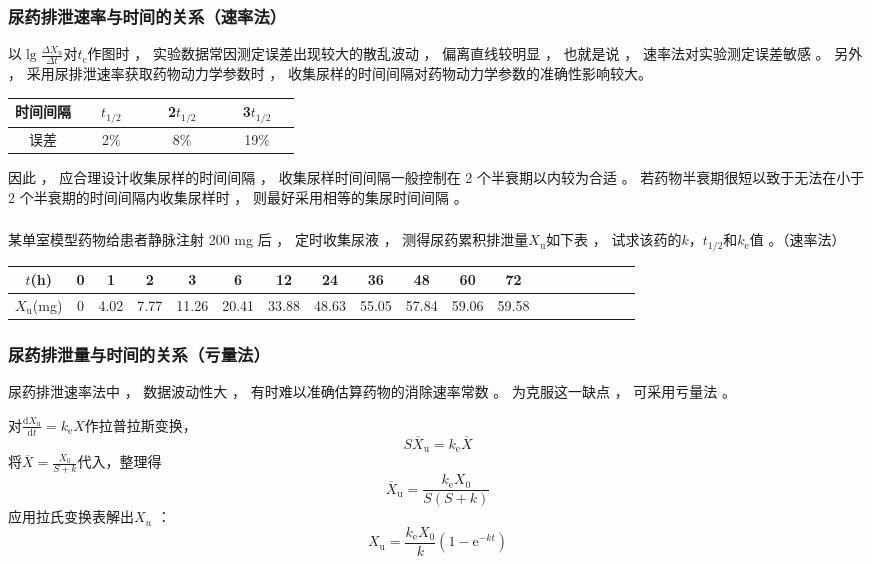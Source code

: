 \documentclass[dvipsnames, svgnames, x11names]{beamer}
\begin{document}
\begin{frame}
    \frametitle{尿药排泄速率与时间的关系（速率法）}
    以$\lg\frac{\Delta X_{\mathrm{u}}}{\Delta t}$对$t_{\mathrm{c}}$作图时 ， 实验数据常因测定误差出现较大的散乱波动 ， 偏离直线较明显 ， 也就是说 ， 速率法对实验测定误差敏感 。 另外 ， 采用尿排泄速率获取药物动力学参数时 ， 收集尿样的时间间隔对药物动力学参数的准确性影响较大。
    \begin{table}
        \centering
        \begin{tabular}{cccc}
            \bottomrule
            时间间隔 & ~~$t_{1/2}$~~ & ~~2$t_{1/2}$~~ & ~~3$t_{1/2}$~~ \\ \hline
            误差 & 2\% & 8\% & 19\% \\ \toprule
        \end{tabular}
    \end{table} 
    因此 ， 应合理设计收集尿样的时间间隔 ， 收集尿样时间间隔一般控制在 2 个半衰期以内较为合适 。 若药物半衰期很短以致于无法在小于 2 个半衰期的时间间隔内收集尿样时 ， 则最好采用相等的集尿时间间隔 。
\end{frame}


\begin{frame}[t]
    \frametitle{}
    \begin{example}
        某单室模型药物给患者静脉注射 200 mg 后 ， 定时收集尿液 ， 测得尿药累积排泄量$X_{\mathrm{u}}$如下表 ， 试求该药的$k$，$t_{1/2}$和$k_\mathrm{e}$值 。（速率法）
        \small{
        \begin{table}
            \centering
            \begin{tabular}{ccccccccccccccccccc}
                \bottomrule
                $t$(h)& 0 & 1 &  2 & 3 & 6 &  12 & 24 & 36 & 48  & 60 & 72  \\ \hline
                $X_{\mathrm{u}}$(mg)& 0 & 4.02 & 7.77  & 11.26 & 20.41 &  33.88 & 48.63 & 55.05 & 57.84  & 59.06 & 59.58 \\ \toprule
            \end{tabular}
        \end{table}}
    \end{example}
\end{frame}


\begin{frame}
    \frametitle{尿药排泄量与时间的关系（亏量法）}
    尿药排泄速率法中 ， 数据波动性大 ， 有时难以准确估算药物的消除速率常数 。 为克服这一缺点 ， 可采用亏量法 。

    对$\frac{\mathrm{d}X_{\mathrm{u}}}{\mathrm{d}t}=k_{\mathrm{e}}X$作拉普拉斯变换，
    \[
        S\overline{X}_{\mathrm{u}}=k_{\mathrm{e}}\overline{X}
    \]
    将$\overline{X}=\frac{X_0}{S+k}$代入，整理得
    \[
        \overline{X}_{\mathrm{u}}=\frac{k_{\mathrm{e}}X_0}{S\left(S+k\right)}
    \]
    应用拉氏变换表解出${X}_{u}$ ：
    \[
        X_{\mathrm{u}}=\frac{k_{\mathrm{e}}X_{0}}{k}(1-\mathrm{e}^{-kt})
    \]
\end{frame}
\end{document}
